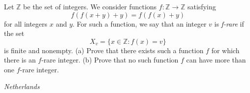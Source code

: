 Let $\mathbb Z$ be the set of integers. We consider functions $f :\mathbb Z\to\mathbb Z$ satisfying
\[f\left(f(x+y)+y\right)=f\left(f(x)+y\right)\]for all integers $x$ and $y$. For such a function, we say that an integer $v$ is \textit{f-rare} if the set
\[X_v=\{x\in\mathbb Z:f(x)=v\}\]is finite and nonempty.
(a) Prove that there exists such a function $f$ for which there is an $f$-rare integer.
(b) Prove that no such function $f$ can have more than one $f$-rare integer.

\textit{Netherlands}
